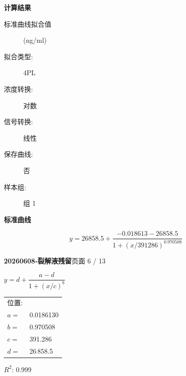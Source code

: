 \documentclass[UTF8,10pt,a4paper,fontset=fandol]{ctexart}
\begin{document}

\vspace{0.5em}

\textbf{计算结果}

\begin{description}
  \item[标准曲线拟合值] (ng/ml)
  \item[拟合类型:] 4PL
  \item[浓度转换:] 对数
  \item[信号转换:] 线性
  \item[保存曲线:] 否
  \item[样本组:] 组 1
\end{description}

\begin{center}
\textbf{标准曲线}


\vspace{0.5em}

\[
y=26858.5+
\frac{-0.018613-26858.5}
 {1+\left(x/391286\right)^{0.970508}}
\]
\end{center}

\newpage

\noindent\textbf{20260608-裂解液残留}\hfill 页面 6 / 13

\medskip

\noindent
$y=d+\dfrac{a-d}{1+(x/c)^b}$

\begin{tabular}{@{}ll@{}}
位置: & \\
$a={}$ & 0.0186130\\
$b={}$ & 0.970508\\
$c={}$ & 391.286\\
$d={}$ & 26\,858.5
\end{tabular}

\medskip

\noindent
$R^2$: 0.999

\medskip
\end{document}
